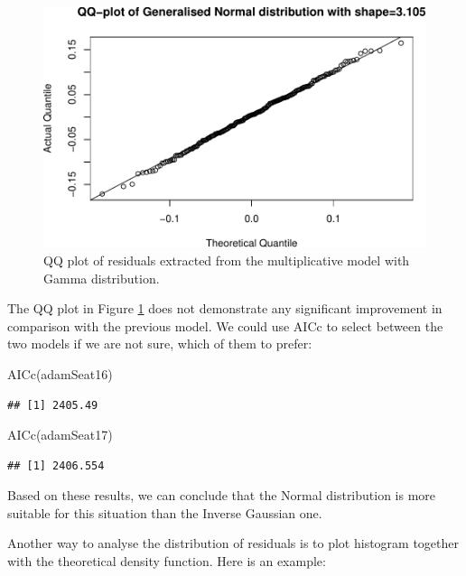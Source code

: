 \documentclass[
]{book}
\newenvironment{Shaded}{\begin{snugshade}}{\end{snugshade}}
\newcommand{\FunctionTok}[1]{\textcolor[rgb]{0.00,0.00,0.00}{#1}}
\newcommand{\NormalTok}[1]{#1}
\theoremstyle{definition}
\theoremstyle{definition}
\theoremstyle{definition}
\theoremstyle{definition}
\theoremstyle{remark}
\begin{document}
\begin{figure}
\centering
\includegraphics{Svetunkov--2022----ADAM_files/figure-latex/adamSeat17QQ-1.pdf}
\caption{\label{fig:adamSeat17QQ}QQ plot of residuals extracted from the multiplicative model with Gamma distribution.}
\end{figure}

The QQ plot in Figure \ref{fig:adamSeat17QQ} does not demonstrate any significant improvement in comparison with the previous model. We could use AICc to select between the two models if we are not sure, which of them to prefer:

\begin{Shaded}
\begin{Highlighting}[]
\FunctionTok{AICc}\NormalTok{(adamSeat16)}
\end{Highlighting}
\end{Shaded}

\begin{verbatim}
## [1] 2405.49
\end{verbatim}

\begin{Shaded}
\begin{Highlighting}[]
\FunctionTok{AICc}\NormalTok{(adamSeat17)}
\end{Highlighting}
\end{Shaded}

\begin{verbatim}
## [1] 2406.554
\end{verbatim}

Based on these results, we can conclude that the Normal distribution is more suitable for this situation than the Inverse Gaussian one.

Another way to analyse the distribution of residuals is to plot histogram together with the theoretical density function. Here is an example:
\end{document}
